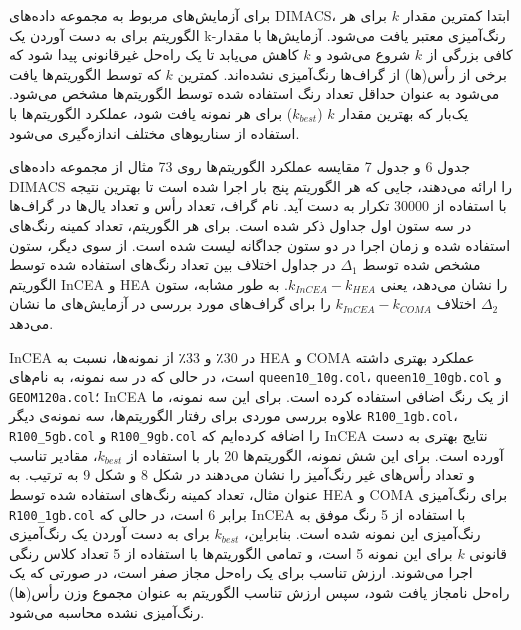 \documentclass[a4paper,10pt]{article}
\begin{document}
            برای آزمایش‌های مربوط به مجموعه داده‌های DIMACS، ابتدا کمترین مقدار $k$ برای هر الگوریتم برای به دست آوردن یک k-رنگ‌آمیزی معتبر یافت می‌شود. آزمایش‌ها با مقدار کافی بزرگی از $k$ شروع می‌شود و $k$ کاهش می‌یابد تا یک راه‌حل غیرقانونی پیدا شود که برخی از رأس(ها) از گراف‌ها رنگ‌آمیزی نشده‌اند. کمترین $k$ که توسط الگوریتم‌ها یافت می‌شود به عنوان حداقل تعداد رنگ استفاده شده توسط الگوریتم‌ها مشخص می‌شود. یک‌بار که بهترین مقدار $k$ ($k_{best}$) برای هر نمونه یافت شود، عملکرد الگوریتم‌ها با استفاده از سناریوهای مختلف اندازه‌گیری می‌شود.

            جدول 6 و جدول 7 مقایسه عملکرد الگوریتم‌ها روی 73 مثال از مجموعه داده‌های DIMACS را ارائه می‌دهند، جایی که هر الگوریتم پنج بار اجرا شده است تا بهترین نتیجه با استفاده از 30000 تکرار به دست آید. نام گراف، تعداد رأس و تعداد یال‌ها در گراف‌ها در سه ستون اول جداول ذکر شده است. برای هر الگوریتم، تعداد کمینه رنگ‌های استفاده شده و زمان اجرا در دو ستون جداگانه لیست شده است. از سوی دیگر، ستون مشخص شده توسط $\Delta_1$ در جداول اختلاف بین تعداد رنگ‌های استفاده شده توسط الگوریتم InCEA و HEA را نشان می‌دهد، یعنی $k_{InCEA} - k_{HEA}$. به طور مشابه، ستون $\Delta_2$ اختلاف $k_{InCEA} - k_{COMA}$ را برای گراف‌های مورد بررسی در آزمایش‌های ما نشان می‌دهد.

            InCEA در 30٪ و 33٪ از نمونه‌ها، نسبت به HEA و COMA عملکرد بهتری داشته است، در حالی که در سه نمونه، به نام‌های \texttt{queen10\_10g.col}، \texttt{queen10\_10gb.col} و \texttt{GEOM120a.col}؛ InCEA از یک رنگ اضافی استفاده کرده است. برای این سه نمونه، ما علاوه بررسی موردی برای رفتار الگوریتم‌ها، سه نمونه‌ی دیگر \texttt{R100\_1gb.col}، \texttt{R100\_5gb.col} و \texttt{R100\_9gb.col} را اضافه کرده‌ایم که InCEA نتایج بهتری به دست آورده است. برای این شش نمونه، الگوریتم‌ها 20 بار با استفاده از $k_{best}$، مقادیر تناسب و تعداد رأس‌های غیر رنگ‌آمیز را نشان می‌دهند در شکل 8 و شکل 9 به ترتیب. به عنوان مثال، تعداد کمینه رنگ‌های استفاده شده توسط HEA و COMA برای رنگ‌آمیزی \texttt{R100\_1gb.col} برابر 6 است، در حالی که InCEA با استفاده از 5 رنگ موفق به رنگ‌آمیزی این نمونه شده است. بنابراین، $k_{best}$ برای به دست آوردن یک رنگ‌آمیزی قانونی $k$ برای این نمونه 5 است، و تمامی الگوریتم‌ها با استفاده از 5 تعداد کلاس رنگی اجرا می‌شوند. ارزش تناسب برای یک راه‌حل مجاز صفر است، در صورتی که یک راه‌حل نامجاز یافت شود، سپس ارزش تناسب الگوریتم به عنوان مجموع وزن رأس(ها) رنگ‌آمیزی نشده محاسبه می‌شود.

            
\end{document}
